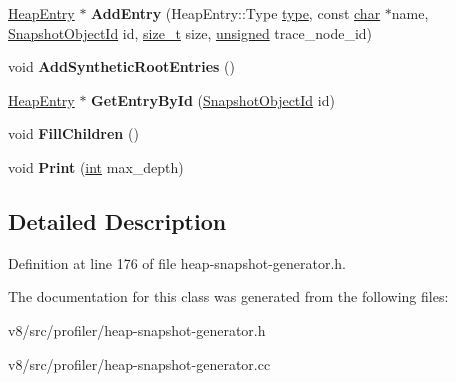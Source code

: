 \begin{DoxyCompactItemize}
\mbox{\hyperlink{classv8_1_1internal_1_1HeapEntry}{Heap\+Entry}} $\ast$ {\bfseries Add\+Entry} (Heap\+Entry\+::\+Type \mbox{\hyperlink{classstd_1_1conditional_1_1type}{type}}, const \mbox{\hyperlink{classchar}{char}} $\ast$name, \mbox{\hyperlink{classuint32__t}{Snapshot\+Object\+Id}} id, \mbox{\hyperlink{classsize__t}{size\+\_\+t}} size, \mbox{\hyperlink{classunsigned}{unsigned}} trace\+\_\+node\+\_\+id)
\item 
\mbox{\label{classv8_1_1internal_1_1HeapSnapshot_a0f939339bb8e7574baf78d2b059d50d1}} 
void {\bfseries Add\+Synthetic\+Root\+Entries} ()
\item 
\mbox{\label{classv8_1_1internal_1_1HeapSnapshot_aa8f063ba3910f5bfb9b324fc52a92cca}} 
\mbox{\hyperlink{classv8_1_1internal_1_1HeapEntry}{Heap\+Entry}} $\ast$ {\bfseries Get\+Entry\+By\+Id} (\mbox{\hyperlink{classuint32__t}{Snapshot\+Object\+Id}} id)
\item 
\mbox{\label{classv8_1_1internal_1_1HeapSnapshot_afa5230c9502d22f7441b990892c91dd8}} 
void {\bfseries Fill\+Children} ()
\item 
\mbox{\label{classv8_1_1internal_1_1HeapSnapshot_a3c183f20e6935d16ec6a852cfb77b252}} 
void {\bfseries Print} (\mbox{\hyperlink{classint}{int}} max\+\_\+depth)
\end{DoxyCompactItemize}


\subsection{Detailed Description}


Definition at line 176 of file heap-\/snapshot-\/generator.\+h.



The documentation for this class was generated from the following files\+:\begin{DoxyCompactItemize}
\item 
v8/src/profiler/heap-\/snapshot-\/generator.\+h\item 
v8/src/profiler/heap-\/snapshot-\/generator.\+cc\end{DoxyCompactItemize}
